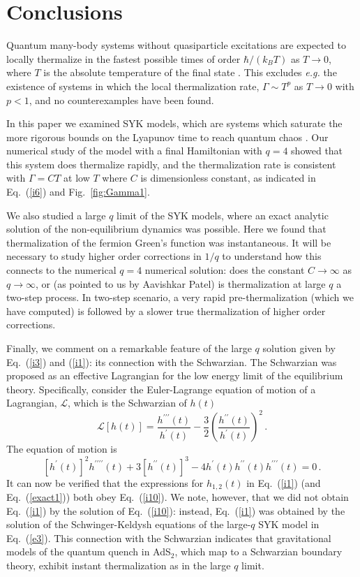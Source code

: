 \documentclass[prx,aps,onecolumn,amsfonts,showpacs,superscriptaddress,preprint,eqsecnum]
{revtex4-1}
\newcommand{\beq}{\begin{equation}}
\newcommand{\eeq}{\end{equation}}
\begin{document}
\section{Conclusions}
\label{sec:conc}

Quantum many-body systems without quasiparticle excitations are expected to locally thermalize
in the fastest possible times of order $\hbar/(k_B T)$ as $T \rightarrow 0$, where $T$ is the absolute temperature of the final
state \cite{ssbook}. 
This excludes {\it e.g.\/} the existence of systems in which the local thermalization rate, $\Gamma \sim T^{p}$ as $T \rightarrow 0$
with $p<1$, and no counterexamples have been found.

In this paper we examined SYK models, which are systems which saturate the more rigorous bounds
on the Lyapunov time to reach quantum chaos \cite{Maldacena2016a}. Our numerical study of the model with a final Hamiltonian with $q=4$
showed that this system does thermalize rapidly, and the thermalization rate is consistent with 
$\Gamma = C T$ at low $T$ where
$C$ is dimensionless constant,
as indicated in Eq.~(\ref{i6}) and Fig.~\ref{fig:Gamma1}.

We also studied a large $q$ limit of the SYK models, where an exact analytic solution of the non-equilibrium
dynamics was possible. Here we found that thermalization of the fermion Green's function was instantaneous. It will be necessary to study higher order corrections in $1/q$ to understand
how this connects to the numerical $q=4$ numerical 
solution: does the constant $C \rightarrow \infty$
as $q \rightarrow \infty$, or (as pointed to us
by Aavishkar Patel) is thermalization at large $q$ a two-step process. In two-step scenario, a very rapid pre-thermalization (which we have computed) is followed by a slower true thermalization of higher order corrections.

Finally, we comment on a remarkable feature of the large $q$ solution given by Eq.~(\ref{i3}) and (\ref{i1}):
its connection with the Schwarzian.
The Schwarzian was proposed as an effective Lagrangian for the low energy limit of the equilibrium theory.
Specifically, consider the Euler-Lagrange equation of motion of a Lagrangian, $\mathcal{L}$, which is the Schwarzian
of $h(t)$
\beq
\mathcal{L}[h(t)] = \frac{h^{\prime\prime\prime} (t)}{h^{\prime} (t)} - \frac{3}{2} \left( \frac{h^{\prime\prime} (t)}{h^{\prime} (t)}\right)^2 \,.
\eeq
The equation of motion is
\beq
\left[ h^{\prime} (t) \right]^2 h^{\prime\prime\prime\prime} (t) 
+ 3 \left[ h^{\prime\prime} (t) \right]^3 
- 4 h^{\prime} (t) h^{\prime\prime} (t)  h^{\prime\prime\prime} (t) = 0 \,. \label{i10}
\eeq
It can now be verified that the expressions for $h_{1,2} (t)$ in Eq.~(\ref{i1}) (and Eq.~(\ref{exact1})) both obey Eq.~(\ref{i10}). We note, however, that we did not obtain Eq.~(\ref{i1}) by the solution of 
Eq.~(\ref{i10}): instead, Eq.~(\ref{i1}) was obtained by the solution of the Schwinger-Keldysh
equations of the large-$q$ SYK model in Eq.~(\ref{e3}).
This connection with the Schwarzian indicates that gravitational models \cite{SS10,SS10b,AAJP15,kitaev2015talk,Maldacena2016,KJ16,HV16} of the quantum quench in AdS$_2$, which map to a Schwarzian boundary theory,
exhibit instant thermalization as in the large $q$ limit. 
\end{document}
